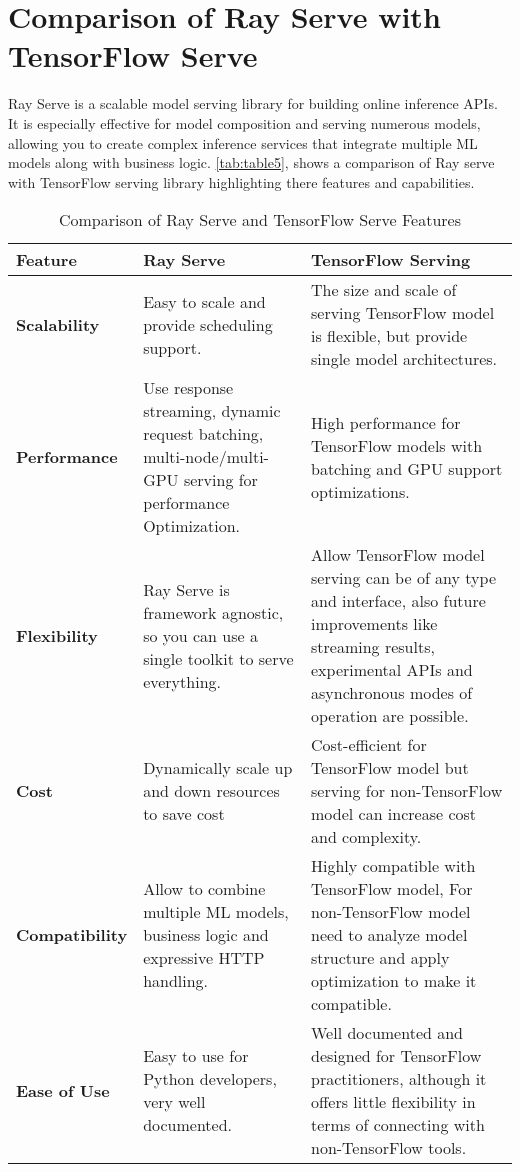 \clearpage

\section{Comparison of Ray Serve with TensorFlow Serve}


Ray Serve is a scalable model serving library for building online inference APIs. It is especially effective for model composition and serving numerous models, allowing you to create complex inference services that integrate multiple ML models along with business logic. \autoref{tab:table5}, shows a comparison of Ray serve with TensorFlow serving library highlighting there features and capabilities. \cite{ray_doc}


\begin{table}[ht]
\centering
\begin{tabular}{|p{3cm}|p{5cm}|p{6cm}|}
\hline
\textbf{Feature} & \textbf{Ray Serve} & \textbf{TensorFlow Serving} \\
\hline
\textbf{Scalability} & Easy to scale and provide scheduling support. \cite{ray_doc} & The size and scale of serving TensorFlow model is flexible, but provide single model architectures. \cite{tensorflow} \\
\hline
\textbf{Performance} & Use response streaming, dynamic request batching, multi-node/multi-GPU serving for performance Optimization. \cite{ray_doc} & High performance for TensorFlow models with batching and GPU support optimizations. \cite{tensorflow}\\
\hline
\textbf{Flexibility} & Ray Serve is framework agnostic, so you can use a single toolkit to serve everything. \cite{ray_doc} & Allow TensorFlow model serving can be of any type and interface, also future improvements like streaming results, experimental APIs and asynchronous modes of operation are possible. \cite{tensorflow} \\
\hline
\textbf{Cost} & Dynamically scale up and down resources to save cost \cite{ray_doc} & Cost-efficient for TensorFlow model but serving for non-TensorFlow model can increase cost and complexity. \cite{tensorflow}\\
\hline
\textbf{Compatibility} & Allow to combine multiple ML models, business logic and expressive HTTP handling. \cite{ray_doc} & Highly compatible with TensorFlow model, For non-TensorFlow model need to analyze model structure and apply optimization to make it compatible. \cite{tensorflow} \\
\hline
\textbf{Ease of Use} & Easy to use for Python developers, very well documented. & Well documented and designed for TensorFlow practitioners, although it offers little flexibility in terms of connecting with non-TensorFlow tools. \cite{tensorflow} \\
\hline

\hline
\end{tabular}
\caption{Comparison of Ray Serve and TensorFlow Serve Features}
\label{tab:table5}
\end{table}

